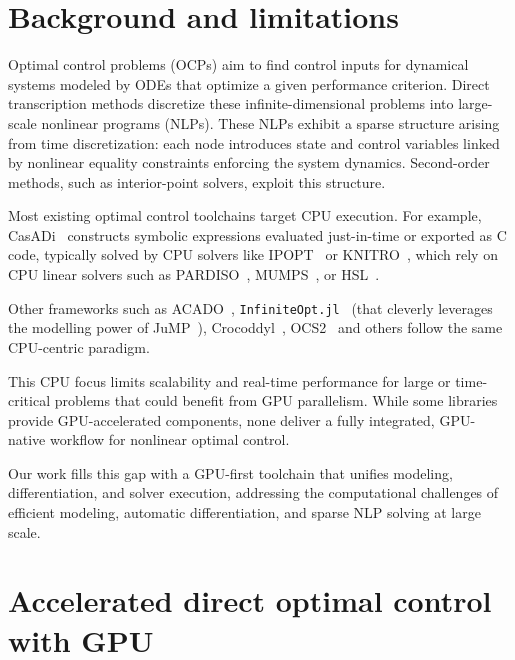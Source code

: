 \documentclass[twoside,leqno,twocolumn]{article}
\begin{document}
\section{Background and limitations}

Optimal control problems (OCPs) aim to find control inputs for dynamical systems modeled by ODEs that optimize a given performance criterion.
Direct transcription methods discretize these infinite-dimensional problems into large-scale nonlinear programs (NLPs).
These NLPs exhibit a sparse structure arising from time discretization: each node introduces state and control variables linked by nonlinear equality constraints enforcing the system dynamics.
Second-order methods, such as interior-point solvers, exploit this structure. %

Most existing optimal control toolchains target CPU execution.
For example, CasADi~\cite{Andersson2019} constructs symbolic expressions evaluated just-in-time or exported as C code, typically solved by CPU solvers like IPOPT~\cite{wachter2006implementation} or KNITRO~\cite{byrd2006k}, which rely on CPU linear solvers such as PARDISO~\cite{schenk2004solving}, MUMPS~\cite{amestoy2000mumps}, or HSL~\cite{fowkes2024libhsl}.

Other frameworks such as ACADO~\cite{houska2011acado}, 
\texttt{InfiniteOpt.jl}~\cite{pulsipher2022unifying} (that cleverly leverages 
the modelling power of JuMP~\cite{dunning2017jump}),
Crocoddyl~\cite{mastalli2020crocoddyl}, OCS2~\cite{OCS2} and others
follow the same CPU-centric paradigm.

This CPU focus limits scalability and real-time performance for large or time-critical problems that could benefit from GPU parallelism.
While some libraries provide GPU-accelerated components, none deliver a fully integrated, GPU-native workflow for nonlinear optimal control.

Our work fills this gap with a GPU-first toolchain that unifies modeling, differentiation, and solver execution, addressing the computational challenges of efficient modeling, automatic differentiation, and sparse NLP solving at large scale.

\section{Accelerated direct optimal control with GPU}
\end{document}
